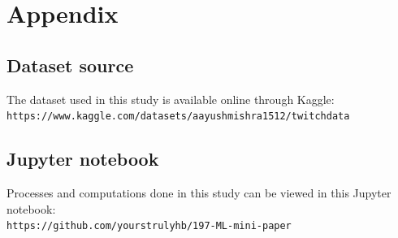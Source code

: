 \documentclass[runningheads]{llncs}
\begin{document}
\newpage
\appendix
\section{Appendix}
\subsection{Dataset source}
The dataset used in this study is available online through Kaggle: \\
\texttt{https://www.kaggle.com/datasets/aayushmishra1512/twitchdata}

\subsection{Jupyter notebook}
Processes and computations done in this study can be viewed in this Jupyter notebook: \\
\texttt{https://github.com/yourstrulyhb/197-ML-mini-paper}
\end{document}
